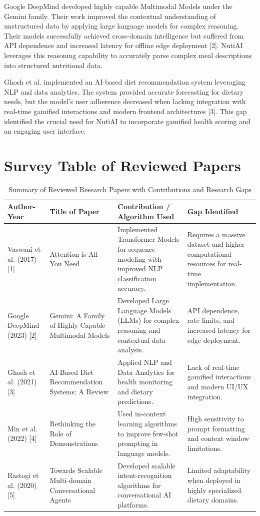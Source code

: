 \documentclass[12pt,a4paper]{report}
\begin{document}
Google DeepMind developed highly capable Multimodal Models under the Gemini family. Their work improved the contextual understanding of unstructured data by applying large language models for complex reasoning. Their models successfully achieved cross-domain intelligence but suffered from API dependence and increased latency for offline edge deployment [2]. NutiAI leverages this reasoning capability to accurately parse complex meal descriptions into structured nutritional data.

Ghosh et al. implemented an AI-based diet recommendation system leveraging NLP and data analytics. The system provided accurate forecasting for dietary needs, but the model's user adherence decreased when lacking integration with real-time gamified interactions and modern frontend architectures [3]. This gap identified the crucial need for NutiAI to incorporate gamified health scoring and an engaging user interface.

\section{Survey Table of Reviewed Papers}

\begin{table}[H]
\centering
\renewcommand{\arraystretch}{1.5}
\begin{tabular}{|p{2.5cm}|p{3.5cm}|p{5cm}|p{3.5cm}|}
\hline
\textbf{Author-Year} & \textbf{Title of Paper} & \textbf{Contribution / Algorithm Used} & \textbf{Gap Identified} \\
\hline
Vaswani et al. (2017) [1] & Attention is All You Need & Implemented Transformer Models for sequence modeling with improved NLP classification accuracy. & Requires a massive dataset and higher computational resources for real-time implementation. \\
\hline
Google DeepMind (2023) [2] & Gemini: A Family of Highly Capable Multimodal Models & Developed Large Language Models (LLMs) for complex reasoning and contextual data analysis. & API dependence, rate limits, and increased latency for edge deployment. \\
\hline
Ghosh et al. (2021) [3] & AI-Based Diet Recommendation Systems: A Review & Applied NLP and Data Analytics for health monitoring and dietary predictions. & Lack of real-time gamified interactions and modern UI/UX integration. \\
\hline
Min et al. (2022) [4] & Rethinking the Role of Demonstrations & Used in-context learning algorithms to improve few-shot prompting in language models. & High sensitivity to prompt formatting and context window limitations. \\
\hline
Rastogi et al. (2020) [5] & Towards Scalable Multi-domain Conversational Agents & Developed scalable intent-recognition algorithms for conversational AI platforms. & Limited adaptability when deployed in highly specialized dietary domains. \\
\hline
\end{tabular}
\caption{Summary of Reviewed Research Papers with Contributions and Research Gaps}
\end{table}
\end{document}

